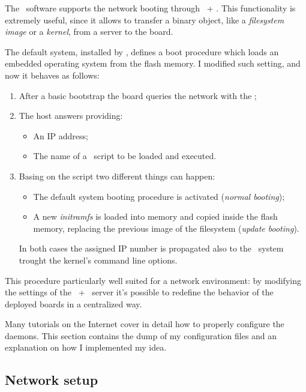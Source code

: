 The \uBoot\ software supports the network booting through \BootP\ + \TFTP.
This functionality is extremely useful, since it allows to transfer a
binary object, like a \emph{filesystem image} or a \emph{kernel}, from a
server to the board.

The default system, installed by , defines a boot
procedure which loads an embedded operating system from the flash memory.
I modified such setting, and now it behaves as follows:

\begin{enumerate}

\item   After a basic bootstrap the board queries the network with the
        ;

\item   The host answers providing:
    \begin{itemize}
    \item   An IP address;
    \item   The name of a \uBoot\ script to be loaded and executed.
    \end{itemize}

\item   Basing on the script two different things can happen:
    \begin{itemize}
    \item   The default system booting procedure is activated
            (\emph{normal booting});
    \item   A new \emph{initramfs} is loaded into memory and copied inside
            the flash memory, replacing the previous image of the
            filesystem (\emph{update booting}).
    \end{itemize}
    In both cases the assigned IP number is propagated also to the \Linux\
    system trought the kernel's command line options.

\end{enumerate}

This procedure particularly well suited for a network environment: by
modifying the settings of the \BootP\ + \TFTP\ server it's possible to
redefine the behavior of the deployed boards in a centralized way.

Many tutorials on the Internet cover in detail how to properly configure
the daemons. This section contains the dump of my configuration files and
an explanation on how I implemented my idea.

\subsection{ Network setup }

